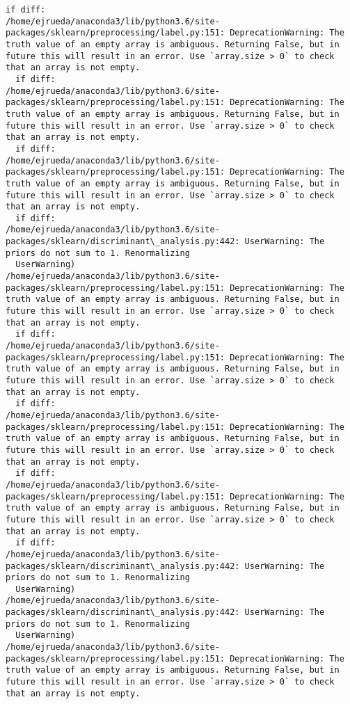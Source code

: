 \documentclass[11pt]{article}
\begin{document}
\begin{Verbatim}[commandchars=\\\{\}]
  if diff:
/home/ejrueda/anaconda3/lib/python3.6/site-packages/sklearn/preprocessing/label.py:151: DeprecationWarning: The truth value of an empty array is ambiguous. Returning False, but in future this will result in an error. Use `array.size > 0` to check that an array is not empty.
  if diff:
/home/ejrueda/anaconda3/lib/python3.6/site-packages/sklearn/preprocessing/label.py:151: DeprecationWarning: The truth value of an empty array is ambiguous. Returning False, but in future this will result in an error. Use `array.size > 0` to check that an array is not empty.
  if diff:
/home/ejrueda/anaconda3/lib/python3.6/site-packages/sklearn/preprocessing/label.py:151: DeprecationWarning: The truth value of an empty array is ambiguous. Returning False, but in future this will result in an error. Use `array.size > 0` to check that an array is not empty.
  if diff:
/home/ejrueda/anaconda3/lib/python3.6/site-packages/sklearn/discriminant\_analysis.py:442: UserWarning: The priors do not sum to 1. Renormalizing
  UserWarning)
/home/ejrueda/anaconda3/lib/python3.6/site-packages/sklearn/preprocessing/label.py:151: DeprecationWarning: The truth value of an empty array is ambiguous. Returning False, but in future this will result in an error. Use `array.size > 0` to check that an array is not empty.
  if diff:
/home/ejrueda/anaconda3/lib/python3.6/site-packages/sklearn/preprocessing/label.py:151: DeprecationWarning: The truth value of an empty array is ambiguous. Returning False, but in future this will result in an error. Use `array.size > 0` to check that an array is not empty.
  if diff:
/home/ejrueda/anaconda3/lib/python3.6/site-packages/sklearn/preprocessing/label.py:151: DeprecationWarning: The truth value of an empty array is ambiguous. Returning False, but in future this will result in an error. Use `array.size > 0` to check that an array is not empty.
  if diff:
/home/ejrueda/anaconda3/lib/python3.6/site-packages/sklearn/preprocessing/label.py:151: DeprecationWarning: The truth value of an empty array is ambiguous. Returning False, but in future this will result in an error. Use `array.size > 0` to check that an array is not empty.
  if diff:
/home/ejrueda/anaconda3/lib/python3.6/site-packages/sklearn/discriminant\_analysis.py:442: UserWarning: The priors do not sum to 1. Renormalizing
  UserWarning)
/home/ejrueda/anaconda3/lib/python3.6/site-packages/sklearn/discriminant\_analysis.py:442: UserWarning: The priors do not sum to 1. Renormalizing
  UserWarning)
/home/ejrueda/anaconda3/lib/python3.6/site-packages/sklearn/preprocessing/label.py:151: DeprecationWarning: The truth value of an empty array is ambiguous. Returning False, but in future this will result in an error. Use `array.size > 0` to check that an array is not empty.

\end{Verbatim}
\end{document}
